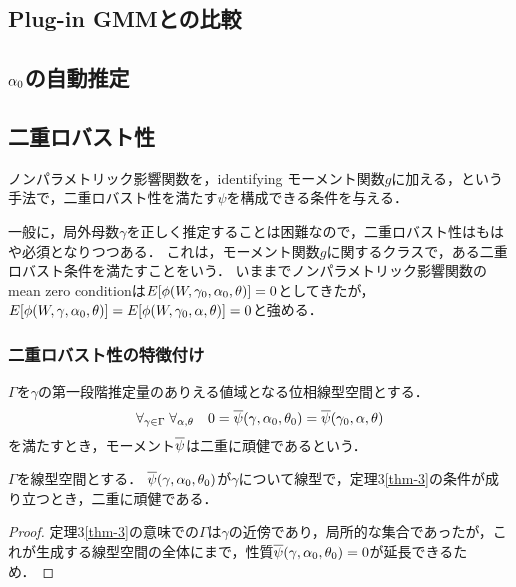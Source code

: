 \documentclass[uplatex,dvipdfmx]{jsreport}
\begin{document}
\subsection{Plug-in GMMとの比較}

\subsection{$\alpha_0$の自動推定}

\subsection{二重ロバスト性}

\begin{tcolorbox}[colframe=ForestGreen, colback=ForestGreen!10!white,breakable,colbacktitle=ForestGreen!40!white,coltitle=black,fonttitle=\bfseries\sffamily,
title=]
    ノンパラメトリック影響関数を，identifying モーメント関数$g$に加える，という手法で，二重ロバスト性を満たす$\psi$を構成できる条件を与える．
\end{tcolorbox}

\begin{discussion}
    一般に，局外母数$\gamma$を正しく推定することは困難なので，二重ロバスト性はもはや必須となりつつある．
    これは，モーメント関数$g$に関するクラスで，ある二重ロバスト条件を満たすことをいう．
    いままでノンパラメトリック影響関数のmean zero conditionは$E[\phi(W,\gamma_0,\alpha_0,\theta)]=0$としてきたが，$E[\phi(W,\gamma,\alpha_0,\theta)]=E[\phi(W,\gamma_0,\alpha,\theta)]=0$と強める．
\end{discussion}

\subsubsection{二重ロバスト性の特徴付け}

\begin{definition}
    $\Gamma$を$\gamma$の第一段階推定量のありえる値域となる位相線型空間とする．
    \[\forall_{\gamma\in\Gamma}\;\forall_{\alpha,\theta}\quad0=\overline{\psi}(\gamma,\alpha_0,\theta_0)=\overline{\psi}(\gamma_0,\alpha,\theta)\]
    を満たすとき，モーメント$\overline{\psi}$は二重に頑健であるという．
\end{definition}

\begin{corollary}
    $\Gamma$を線型空間とする．
    $\overline{\psi}(\gamma,\alpha_0,\theta_0)$が$\gamma$について線型で，定理3\ref{thm-3}の条件が成り立つとき，二重に頑健である．
\end{corollary}
\begin{proof}
    定理3\ref{thm-3}の意味での$\Gamma$は$\gamma$の近傍であり，局所的な集合であったが，これが生成する線型空間の全体にまで，性質$\overline{\psi}(\gamma,\alpha_0,\theta_0)=0$が延長できるため．
\end{proof}
\end{document}
